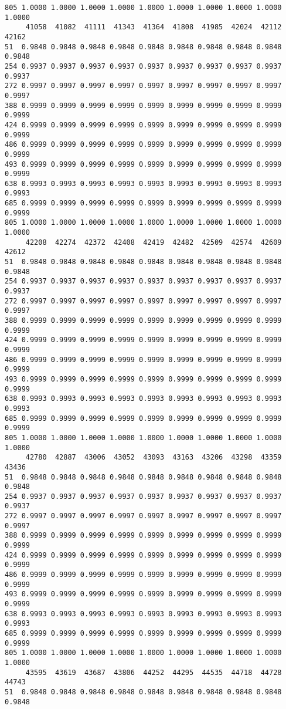 \documentclass[
]{report}
\begin{document}
\begin{verbatim}
805 1.0000 1.0000 1.0000 1.0000 1.0000 1.0000 1.0000 1.0000 1.0000 1.0000
     41058  41082  41111  41343  41364  41808  41985  42024  42112  42162
51  0.9848 0.9848 0.9848 0.9848 0.9848 0.9848 0.9848 0.9848 0.9848 0.9848
254 0.9937 0.9937 0.9937 0.9937 0.9937 0.9937 0.9937 0.9937 0.9937 0.9937
272 0.9997 0.9997 0.9997 0.9997 0.9997 0.9997 0.9997 0.9997 0.9997 0.9997
388 0.9999 0.9999 0.9999 0.9999 0.9999 0.9999 0.9999 0.9999 0.9999 0.9999
424 0.9999 0.9999 0.9999 0.9999 0.9999 0.9999 0.9999 0.9999 0.9999 0.9999
486 0.9999 0.9999 0.9999 0.9999 0.9999 0.9999 0.9999 0.9999 0.9999 0.9999
493 0.9999 0.9999 0.9999 0.9999 0.9999 0.9999 0.9999 0.9999 0.9999 0.9999
638 0.9993 0.9993 0.9993 0.9993 0.9993 0.9993 0.9993 0.9993 0.9993 0.9993
685 0.9999 0.9999 0.9999 0.9999 0.9999 0.9999 0.9999 0.9999 0.9999 0.9999
805 1.0000 1.0000 1.0000 1.0000 1.0000 1.0000 1.0000 1.0000 1.0000 1.0000
     42208  42274  42372  42408  42419  42482  42509  42574  42609  42612
51  0.9848 0.9848 0.9848 0.9848 0.9848 0.9848 0.9848 0.9848 0.9848 0.9848
254 0.9937 0.9937 0.9937 0.9937 0.9937 0.9937 0.9937 0.9937 0.9937 0.9937
272 0.9997 0.9997 0.9997 0.9997 0.9997 0.9997 0.9997 0.9997 0.9997 0.9997
388 0.9999 0.9999 0.9999 0.9999 0.9999 0.9999 0.9999 0.9999 0.9999 0.9999
424 0.9999 0.9999 0.9999 0.9999 0.9999 0.9999 0.9999 0.9999 0.9999 0.9999
486 0.9999 0.9999 0.9999 0.9999 0.9999 0.9999 0.9999 0.9999 0.9999 0.9999
493 0.9999 0.9999 0.9999 0.9999 0.9999 0.9999 0.9999 0.9999 0.9999 0.9999
638 0.9993 0.9993 0.9993 0.9993 0.9993 0.9993 0.9993 0.9993 0.9993 0.9993
685 0.9999 0.9999 0.9999 0.9999 0.9999 0.9999 0.9999 0.9999 0.9999 0.9999
805 1.0000 1.0000 1.0000 1.0000 1.0000 1.0000 1.0000 1.0000 1.0000 1.0000
     42780  42887  43006  43052  43093  43163  43206  43298  43359  43436
51  0.9848 0.9848 0.9848 0.9848 0.9848 0.9848 0.9848 0.9848 0.9848 0.9848
254 0.9937 0.9937 0.9937 0.9937 0.9937 0.9937 0.9937 0.9937 0.9937 0.9937
272 0.9997 0.9997 0.9997 0.9997 0.9997 0.9997 0.9997 0.9997 0.9997 0.9997
388 0.9999 0.9999 0.9999 0.9999 0.9999 0.9999 0.9999 0.9999 0.9999 0.9999
424 0.9999 0.9999 0.9999 0.9999 0.9999 0.9999 0.9999 0.9999 0.9999 0.9999
486 0.9999 0.9999 0.9999 0.9999 0.9999 0.9999 0.9999 0.9999 0.9999 0.9999
493 0.9999 0.9999 0.9999 0.9999 0.9999 0.9999 0.9999 0.9999 0.9999 0.9999
638 0.9993 0.9993 0.9993 0.9993 0.9993 0.9993 0.9993 0.9993 0.9993 0.9993
685 0.9999 0.9999 0.9999 0.9999 0.9999 0.9999 0.9999 0.9999 0.9999 0.9999
805 1.0000 1.0000 1.0000 1.0000 1.0000 1.0000 1.0000 1.0000 1.0000 1.0000
     43595  43619  43687  43806  44252  44295  44535  44718  44728  44743
51  0.9848 0.9848 0.9848 0.9848 0.9848 0.9848 0.9848 0.9848 0.9848 0.9848

\end{verbatim}
\end{document}
